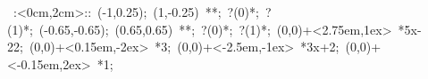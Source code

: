 \hbox{
\xy    <2cm,0cm>:<0cm,2cm>::
       (-1,0.25); (1,-0.25) **\dir{-}; ?(0)*\dir{<}; ?(1)*\dir{>};
       (-0.65,-0.65); (0.65,0.65) **\dir{-}; ?(0)*\dir{<}; ?(1)*\dir{>};
       (0,0)+<2.75em,1ex> *{5x-22};
       (0,0)+<0.15em,-2ex> *{3};
       (0,0)+<-2.5em,-1ex> *{3x+2};
       (0,0)+<-0.15em,2ex> *{1};
\endxy}
